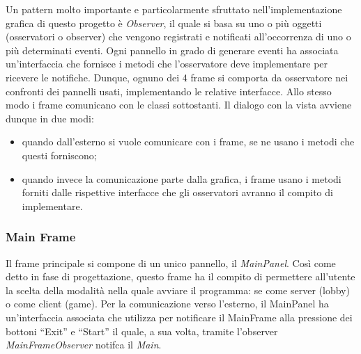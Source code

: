 Un pattern molto importante e particolarmente sfruttato nell'implementazione
grafica di questo progetto è \textit{Observer}, il quale si basa su uno o più
oggetti (osservatori o observer) che vengono registrati e notificati
all'occorrenza di uno o più determinati eventi. Ogni pannello in grado di
generare eventi ha associata un'interfaccia che fornisce i metodi che
l'osservatore deve implementare per ricevere le notifiche. Dunque, ognuno dei 4
frame si comporta da osservatore nei confronti dei pannelli usati, implementando
le relative interfacce. Allo stesso modo i frame comunicano con le classi
sottostanti. Il dialogo con la vista avviene dunque in due modi:
\begin{itemize}
	\item quando dall'esterno si vuole comunicare con i frame, se ne usano i
	metodi che questi forniscono;
	\item quando invece la comunicazione parte dalla grafica, i frame usano i
	metodi forniti dalle rispettive interfacce che gli osservatori avranno il
	compito di implementare.
\end{itemize}



\subsubsection{Main Frame}
Il frame principale si compone di un unico pannello, il \textit{MainPanel}. Così
come detto in fase di progettazione,
questo frame ha il compito di
permettere all'utente la scelta della modalità nella quale avviare il programma:
se come server (lobby) o come client (game).\newline
Per la comunicazione verso l'esterno, il MainPanel ha un'interfaccia associata
che utilizza per notificare il MainFrame alla pressione dei bottoni ``Exit'' e
``Start'' il quale, a sua volta, tramite l'observer \textit{MainFrameObserver}
notifca il \textit{Main}.



